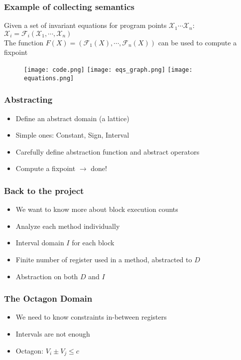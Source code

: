 \documentclass{beamer}
\begin{document}
\begin{frame}
    \frametitle{Example of collecting semantics}
    \pause 
    Given a set of invariant equations for program points $\mathcal X_1 \cdots \mathcal X_n$: \\
    $\mathcal X_i = \mathcal F_i(\mathcal X_1,\cdots, \mathcal X_n)$\\ \pause
    The function $F(X)=(\mathcal F_1 (X),\cdots, \mathcal F_n (X))$ can be used to compute a fixpoint \pause 
    \begin{figure}[h]
        \texttt{[image: code.png]} \pause \texttt{[image: eqs\_graph.png]} \pause \texttt{[image: equations.png]}
    \end{figure}
\end{frame}

\begin{frame}
    \frametitle{Abstracting}
    \begin{itemize}
        \pause
        \item Define an abstract domain (a lattice) \pause 
        \item Simple ones: Constant, Sign, Interval \pause
        \item Carefully define abstraction function and abstract operators \pause 
        \item Compute a fixpoint $\rightarrow$ done!
    \end{itemize}
\end{frame}
\begin{frame}
    \frametitle{Back to the project}
    \begin{itemize}
        \item We want to know more about block execution counts \pause 
        \item Analyze each method individually \pause 
        \item Interval domain $I$ for each block \pause 
        \item Finite number of register used in a method, abstracted to $D$ \pause 
        \item Abstraction on both $D$ and $I$
    \end{itemize}
\end{frame}

\begin{frame}
    \frametitle{The Octagon Domain}
    \begin{itemize}
        \pause
        \item We need to know constraints in-between registers \pause
        \item Intervals are not enough \pause 
        \item Octagon: $V_i \pm V_j \leq c$
    \end{itemize}
\end{frame}
\end{document}
